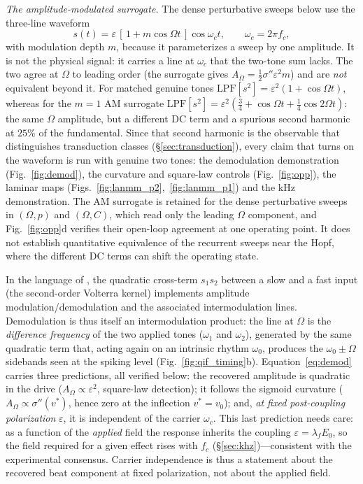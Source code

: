 \documentclass[11pt,a4paper]{article}
\newcommand{\Sig}{\sigma}
\newcommand{\half}{\tfrac{1}{2}}
\begin{document}
\emph{The amplitude-modulated surrogate.} The dense perturbative sweeps below use the
three-line waveform
\begin{equation}
s(t)=\varepsilon\,[\,1+m\cos\Omega t\,]\cos\omega_c t,\qquad \omega_c=2\pi f_c ,
\label{eq:amsur}
\end{equation}
with modulation depth $m$, because it parameterizes a sweep by one amplitude. It is not
the physical signal: it carries a line at $\omega_c$ that the two-tone sum lacks. The two
agree at $\Omega$ to leading order (the surrogate gives
$A_\Omega=\half\Sig''\varepsilon^2m$) and are \emph{not} equivalent beyond it. For matched genuine tones $\mathrm{LPF}[s^2]=\varepsilon^2(1+\cos\Omega t)$,
whereas for the $m=1$ AM surrogate
$\mathrm{LPF}[s^2]=\varepsilon^2(\tfrac34+\cos\Omega t+\tfrac14\cos2\Omega t)$: the same
$\Omega$ amplitude, but a different DC term and a spurious second harmonic at $25\%$ of
the fundamental. Since that second harmonic is the observable that
distinguishes transduction classes (\S\ref{sec:transduction}), every claim that turns on
the waveform is run with genuine two tones: the demodulation demonstration
(Fig.~\ref{fig:demod}), the curvature and square-law controls (Fig.~\ref{fig:opp}), the
laminar maps (Figs.~\ref{fig:lanmm_p2},~\ref{fig:lanmm_p1}) and the kHz demonstration.
The AM surrogate is retained for the dense perturbative sweeps in $(\Omega,p)$ and
$(\Omega,C)$, which read only the leading $\Omega$ component, and
Fig.~\ref{fig:opp}d verifies their open-loop agreement at one operating point.
It does not establish quantitative equivalence of the recurrent sweeps near the Hopf,
where the different DC terms can shift the operating state.

In the language of \cite{ruffini2025ham}, the quadratic cross-term $s_1 s_2$ between a
slow and a fast input (the second-order Volterra kernel) implements amplitude
modulation/demodulation and the associated intermodulation lines.
Demodulation is thus itself an intermodulation product: the line at $\Omega$ is the
\emph{difference frequency} of the two applied tones ($\omega_1$ and $\omega_2$),
generated by the same quadratic term that, acting again on an intrinsic
rhythm $\omega_0$, produces the $\omega_0\pm\Omega$ sidebands seen at the spiking level
(Fig.~\ref{fig:qif_timing}b).
Equation~\eqref{eq:demod} carries three predictions, all verified below: the
recovered amplitude is quadratic in the drive ($A_\Omega\propto\varepsilon^2$,
square-law detection); it follows the sigmoid curvature
($A_\Omega\propto\Sig''(v^*)$, hence zero at the inflection $v^*=v_0$); and, \emph{at
fixed post-coupling polarization} $\varepsilon$, it is independent of the carrier
$\omega_c$. This last prediction needs care: as a function of the \emph{applied} field the
response inherits the coupling $\varepsilon=\lambda_f E_0$, so the field required for a
given effect rises with $f_c$ (\S\ref{sec:khz})---consistent with the experimental
consensus. Carrier independence is thus a statement about the recovered beat component at fixed
polarization, not about the applied field.
\end{document}
